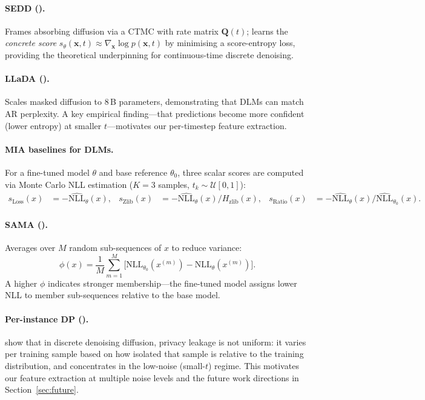 \documentclass{article}
\newcommand{\NLL}{\mathrm{NLL}}
\newcommand{\bx}{\mathbf{x}}
\begin{document}
\paragraph{SEDD (\citealt{louSEDD2024}).}
Frames absorbing diffusion via a CTMC with rate matrix $\mathbf{Q}(t)$;
learns the \emph{concrete score}
$s_\theta(\bx,t)\!\approx\!\nabla_\bx\!\log p(\bx,t)$
by minimising a score-entropy loss, providing the theoretical underpinning
for continuous-time discrete denoising.

\paragraph{LLaDA (\citealt{nieLLaDA2025}).}
Scales masked diffusion to 8\,B parameters, demonstrating that DLMs can
match AR perplexity.  A key empirical finding---that predictions become
more confident (lower entropy) at smaller $t$---motivates our per-timestep
feature extraction.

\paragraph{MIA baselines for DLMs.}
For a fine-tuned model $\theta$ and base reference $\theta_0$, three
scalar scores are computed via Monte Carlo NLL estimation
($K{=}3$ samples, $t_k\!\sim\!\mathcal{U}[0,1]$):
\begin{align}
  s_{\mathrm{Loss}}(x)  &= -\widehat{\NLL}_\theta(x), &
  s_{\mathrm{Zlib}}(x)  &= -\widehat{\NLL}_\theta(x)\big/H_{\mathrm{zlib}}(x), &
  s_{\mathrm{Ratio}}(x) &= -\widehat{\NLL}_\theta(x)\big/\widehat{\NLL}_{\theta_0}(x).
  \label{eq:baselines}
\end{align}

\paragraph{SAMA (\citealt{shi2025sama}).}
Averages over $M$ random sub-sequences of $x$ to reduce variance:
\begin{equation}
  \phi(x) = \frac{1}{M}\sum_{m=1}^{M}
  \bigl[\NLL_{\theta_0}(x^{(m)}) - \NLL_\theta(x^{(m)})\bigr].
  \label{eq:sama}
\end{equation}
A higher $\phi$ indicates stronger membership---the fine-tuned model
assigns lower NLL to member sub-sequences relative to the base model.

\paragraph{Per-instance DP (\citealt{wei2023pdp}).}
\citet{wei2023pdp} show that in discrete denoising diffusion, privacy leakage
is not uniform: it varies per training sample based on how isolated that
sample is relative to the training distribution, and concentrates in the
low-noise (small-$t$) regime.  This motivates our feature extraction at
multiple noise levels and the future work directions in Section~\ref{sec:future}.
\end{document}

